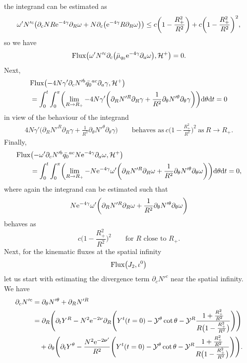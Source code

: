 \documentclass[pdftex]{sigma}
\def\ptl{\partial}%
\def\mbo#1{\boldsymbol{#1}}%
\numberwithin{equation}{section}
\begin{document}
the integrand can be estimated as
\begin{align*}
\omega' N'^c \bigl(\ptl_c N R {\rm e}^{-4\gamma} \ptl_R \omega + N \ptl_c \bigl({\rm e}^{-4\gamma} R \ptl_R \omega\bigr)\bigr) \leq c \biggl(1- \frac{R^2_+}{R^2}\biggr) + c \biggl(1- \frac{R^2_+}{R^2}\biggr)^2,
\end{align*}
so we have
\begin{align*}
{\rm Flux} \bigl(\omega' N'^c \ptl_c \bigl(\bar{\mu}_{q_0} {\rm e}^{-4\gamma} \ptl_a \omega\bigr), \mathcal{H}^+\bigr) =0.
\end{align*}
Next,
\begin{align*}
& {\rm Flux} \bigl(-4 N \gamma' \ptl_c N'^b \bar{q_0}^{ac} \ptl_a \gamma, \mathcal{H}^+\bigr) \notag\\
&{}= \int^t_0 \int^\pi_0 \biggl(\lim_{R \to R_+} -4 N \gamma' \biggl(\ptl_R N'^R \ptl_R \gamma + \frac{1}{R^2} \ptl_\theta N'^ \theta \ptl_ \theta \gamma\biggr) \biggr) {\rm d}\theta {\rm d}t
 =0
\end{align*}
in view of the behaviour of the integrand
\begin{align*}
 4 N \gamma' \biggl(\ptl_R N'^R \ptl_R \gamma + \frac{1}{R^2} \ptl_\theta N'^ \theta \ptl_ \theta \gamma\biggr) \qquad \text{behaves as} \ c\biggl(1- \frac{R^2_+}{R^2}\biggr)^2 \ \text{as} \ R \to R_+.
\end{align*}
Finally,
\begin{align*}
& {\rm Flux} \bigl(-\omega' \ptl_c N'^b \bar{q_0}^{ac} N {\rm e}^{-4\gamma} \ptl_a \omega, \mathcal{H}^+\bigr) \notag \\
 &{}\qquad{}= \int^t_0 \int^\pi_0 \biggl(\lim_{R \to R_+} - N {\rm e}^{-4 \gamma} \omega' \biggl(\ptl_R N'^R \ptl_R \omega + \frac{1}{R^2} \ptl_\theta N'^\theta \ptl_\theta \omega\biggr) \biggr) {\rm d}\theta {\rm d}t
= 0,
\end{align*}
where again the integrand can be estimated such that
\[
N {\rm e}^{-4 \gamma} \omega' \biggl(\ptl_R N'^R \ptl_R \omega + \frac{1}{R^2} \ptl_\theta N'^\theta \ptl_\theta \omega\biggr)
\]
behaves as
\[
 c\biggl(1- \frac{R^2_+}{R^2}\biggr)^2 \qquad \text{for $R$ close to $R_+$}.
\]
Next, for the kinematic fluxes at the spatial infinity
\begin{align*}
{\rm Flux}\bigl(J_2, \iota^0\bigr)
\end{align*}
let us start with estimating the divergence term $\displaystyle \ptl_c N'^c$ near the spatial infinity. We have
\begin{align*}
\ptl_c N'^c &{}= \ptl_\theta N'^ \theta + \ptl_R N'^R \notag\\
&{}= \ptl_R \Biggl(\ptl_t Y^R - N^2 {\rm e}^{-2 \nu} \ptl_R \Biggl(Y^t(t=0) - \mathcal{Y}^ \theta \cot \theta - \mathcal{Y}^R \frac{ 1 + \frac{R^2_+}{R^2}}{ R \bigl(1- \frac{R^2_+}{R^2}\bigr)} \Biggr) \Biggr) \notag \\
&\quad{} + \ptl_\theta \Biggl(\ptl_t Y^\theta - \frac{N^2 {\rm e}^{-2\mbo{\nu}'}}{R^2} \Biggl(Y^t(t=0) - \mathcal{Y}^\theta \cot \theta - \mathcal{Y}^R \frac{ 1 + \frac{R^2_+}{R^2}}{ R \bigl(1- \frac{R^2_+}{R^2}\bigr)}\Biggr)\Biggr).
\end{align*}
\end{document}

